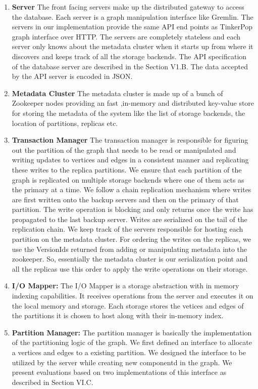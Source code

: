 \documentclass[letterpaper, 11 pt, conference]{ieeeconf}  %
\begin{document}
\begin{enumerate}
\item \textbf{Server}
The front facing servers make up the distributed gateway to access the database. Each server is a graph manipulation interface like Gremlin\cite{tinkerpop}. The servers in our implementation provide the same API end points as TinkerPop\cite{tinkerpop} graph interface over HTTP. The servers are completely stateless and each server only knows about the metadata cluster when it starts up from where it discovers and keeps track of all the storage backends. The API specification of the database server are described in the Section V1.B. The data accepted by the API server is encoded in JSON.\\
\item \textbf{Metadata Cluster}
The metadata cluster is made up of a bunch of Zookeeper nodes providing an fast ,in-memory and distributed key-value store for storing the metadata of the system like the list of storage backends, the location of partitions, replicas etc.\\
\item \textbf{Transaction Manager}
The transaction manager is responsible for figuring out the partition of the graph that needs to be read or manipulated and writing updates to vertices and edges in a consistent manner and replicating these writes to the replica partitions. We ensure that each partition of the graph is replicated on multiple storage backends where one of them acts as the primary at a time. We follow a chain replication mechanism where writes are first written onto the backup servers and then on the primary of that partition. The write operation is blocking and only returns once the write has propagated to the last backup server. Writes are serialized on the tail of the replication chain. We keep track of the servers responsible for hosting each partition on the metadata cluster. For ordering the writes on the replicas, we use the VersionIds returned from adding or manipulating metadata into the zookeeper. So, essentially the metadata cluster is our serialization point and all the replicas use this order to apply the write operations on their storage. \\
\item \textbf{I/O Mapper: }
The I/O Mapper is a storage abstraction with in memory indexing capabilities. It receives operations from the server and executes it on the local memory and storage. Each storage stores the vetices and edges of the partitions it is chosen to host along with their in-memory index.\\

\item \textbf{Partition Manager: }
The partition manager is basically the implementation of the partitioning logic of the graph. We first defined an interface to allocate a vertices and edges to a existing partition. We designed the interface to be utilized by the server while creating new componentd in the graph. We present evaluations based on two implementations of this interface as described in Section VI.C.
\end{enumerate}
\end{document}
